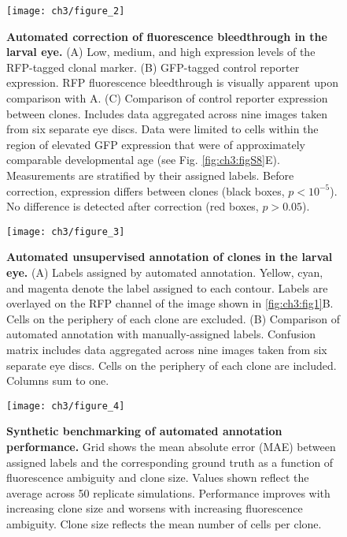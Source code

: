 \begin{figure}[h]
\texttt{[image: ch3/figure\_2]}
\caption[Automated correction of fluorescence bleedthrough in the larval eye.]{\textbf{Automated correction of fluorescence bleedthrough in the larval eye.} (A) Low, medium, and high expression levels of the RFP-tagged clonal marker. (B) GFP-tagged control reporter expression. RFP fluorescence bleedthrough is visually apparent upon comparison with A. (C) Comparison of control reporter expression between clones. Includes data aggregated across nine images taken from six separate eye discs. Data were limited to cells within the region of elevated GFP expression that were of approximately comparable developmental age (see Fig. \ref{fig:ch3:figS8}E). Measurements are stratified by their assigned labels. Before correction, expression differs between clones (black boxes, $p<10^{-5}$). No difference is detected after correction (red boxes, $p>0.05$).}
\label{fig:ch3:fig2}
\end{figure}

\begin{figure}[h]
\texttt{[image: ch3/figure\_3]}
\caption[Automated unsupervised annotation of clones in the larval eye.]{\textbf{Automated unsupervised annotation of clones in the larval eye.} (A) Labels assigned by automated annotation. Yellow, cyan, and magenta denote the label assigned to each contour. Labels are overlayed on the RFP channel of the image shown in \ref{fig:ch3:fig1}B. Cells on the periphery of each clone are excluded. (B) Comparison of automated annotation with manually-assigned labels. Confusion matrix includes data aggregated across nine images taken from six separate eye discs. Cells on the periphery of each clone are included. Columns sum to one.}
\label{fig:ch3:fig3}
\end{figure}

\begin{figure}[h]
\texttt{[image: ch3/figure\_4]}
\caption[Synthetic benchmarking of automated annotation performance.]{\textbf{Synthetic benchmarking of automated annotation performance.} Grid shows the mean absolute error (MAE) between assigned labels and the corresponding ground truth as a function of fluorescence ambiguity and clone size. Values shown reflect the average across 50 replicate simulations. Performance improves with increasing clone size and worsens with increasing fluorescence ambiguity. Clone size reflects the mean number of cells per clone.}
\label{fig:ch3:fig4}
\end{figure}

